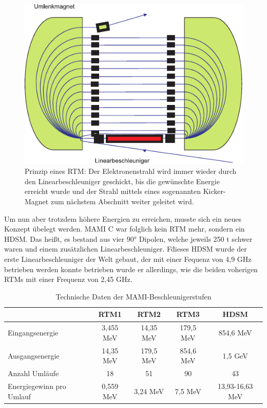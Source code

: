 \documentclass[a4paper,11pt,oneside,final,german,openbib,pdftex]{scrbook}
\begin{document}
\begin{figure}[h]
	\begin{center}
	\includegraphics{RTM}	
	\caption{Prinzip eines RTM: Der Elektronenstrahl wird immer wieder durch den Linearbeschleuniger geschickt, bis die gew\"unschte Energie erreicht wurde und der Strahl mittels eines sogenannten Kicker-Magnet zum n\"achstem Abschnitt weiter geleitet wird.\cite{KPh07} }
	\label{fig.RTM}
\end{center}
\end{figure}

Um nun aber trotzdem h\"ohere Energien zu erreichen, musste sich ein neues Konzept \"ubelegt werden. MAMI C war folglich kein RTM mehr, sondern ein HDSM. Das hei{\ss}t, es bestand aus vier 90° Dipolen, welche jeweils 250 t schwer waren und einem zus\"atzlichen Linearbeschleuniger. F\" dieses HDSM wurde der erste Linearbeschleuniger der Welt gebaut, der mit einer Fequenz von 4,9 GHz betrieben werden konnte betrieben wurde er allerdings, wie die beiden voherigen RTMs mit einer Frequenz von 2,45 GHz.
\newline
\begin{table}[h]
	\begin{center}
		\begin{tabular}{|l|c|c|c|c|}
			\hline
			& RTM1 & RTM2 & RTM3 & HDSM \\
			\hline
			\hline
			Eingangsenergie &3,455 MeV  &  14,35 MeV& 179,5 MeV  &854,6 MeV \\ \hline
			Ausgangsenergie &14,35 MeV  &  179,5 MeV &854,6 MeV  & 1,5 GeV \\ \hline
			Anzahl Uml\"aufe&18  &51  &90  &43 \\ \hline
			Energiegewinn pro Umlauf &0,559 MeV  & 3,24 MeV & 7,5 MeV  & 13,93-16,63 MeV \\ \hline
			
	
		\end{tabular}
		\caption{Technische Daten der MAMI-Beschleunigerstufen \cite{Un08}}
		\label{tab.MAMIstufen}
	\end{center}
\end{table}
\end{document}
